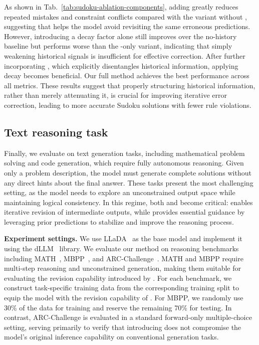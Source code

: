 As shown in Tab.~\ref{tab:sudoku-ablation-components}, adding \temporalmethod greatly reduces repeated mistakes and constraint conflicts compared with the variant without \temporalmethod, suggesting that \temporalmethodfull helps the model avoid revisiting the same erroneous predictions. 
However, introducing a decay factor alone still improves over the no-history baseline but performs worse than the \temporalmethod-only variant, indicating that simply weakening historical signals is insufficient for effective correction. After further incorporating \distancemethod, which explicitly disentangles historical information, applying decay becomes beneficial. Our full method achieves the best performance across all metrics. These results suggest that properly structuring historical information, rather than merely attenuating it, is crucial for improving iterative error correction, leading to more accurate Sudoku solutions with fewer rule violations.


\subsection{Text reasoning task}
\label{sec:textgen-experiments}

Finally, we evaluate on text generation tasks, including mathematical problem solving and code generation, which require fully autonomous reasoning.
Given only a problem description, the model must generate complete solutions without any direct hints about the final answer. These tasks present the most challenging setting, as the model needs to explore an unconstrained output space while maintaining logical consistency.
In this regime, both \methodfull and \temporalmethodfull become critical: \method enables iterative revision of intermediate outputs, while \temporalmethod provides essential guidance by leveraging prior predictions to stabilize and improve the reasoning process.

\textbf{Experiment settings.}
We use LLaDA~\citep{nie2025large} as the base model and implement it using the dLLM~\citep{zhou2026dllm} library. We evaluate our method on reasoning benchmarks including MATH~\citep{lightman2023let,hendrycks2021measuring,lewkowycz2022solving}, MBPP~\citep{austin2021program}, and ARC-Challenge~\citep{clark2018think}. MATH and MBPP require multi-step reasoning and unconstrained generation, making them suitable for evaluating the revision capability introduced by \method. For each benchmark, we construct task-specific training data from the corresponding training split to equip the model with the revision capability of \method. For MBPP, we randomly use 30\% of the data for training and reserve the remaining 70\% for testing. In contrast, ARC-Challenge is evaluated in a standard forward-only multiple-choice setting, serving primarily to verify that introducing \method does not compromise the model’s original inference capability on conventional generation tasks.

